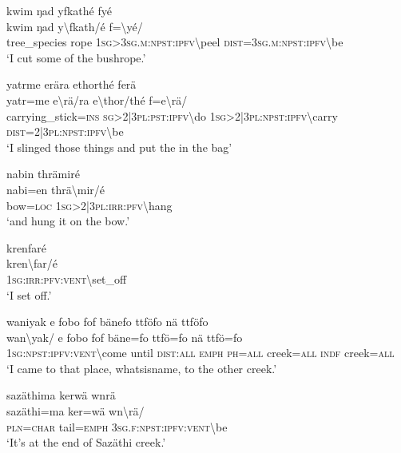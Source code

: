 \ea\label{ex:13:a1361}
kwim ŋad yfkathé fyé\\
\gll kwim	ŋad	y{\textbackslash}fkath/é	f={\textbackslash}yé/\\
     tree\_species	rope	1\textsc{sg}>3\textsc{sg}.\textsc{m}:\textsc{npst}:\textsc{ipfv}{\textbackslash}peel	\textsc{dist}=3\textsc{sg}.\textsc{m}:\textsc{npst}:\textsc{ipfv}{\textbackslash}be\\
\glt `I cut some of the bushrope.'
\z

\ea\label{ex:13:a1362}
yatrme erära ethorthé ferä\\
\gll yatr=me	e{\textbackslash}rä/ra	e{\textbackslash}thor/thé	f=e{\textbackslash}rä/\\
     carrying\_stick=\textsc{ins}	\textsc{sg}>2|3\textsc{pl}:\textsc{pst}:\textsc{ipfv}{\textbackslash}do	1\textsc{sg}>2|3\textsc{pl}:\textsc{npst}:\textsc{ipfv}{\textbackslash}carry	\textsc{dist}=2|3\textsc{pl}:\textsc{npst}:\textsc{ipfv}{\textbackslash}be\\
\glt `I slinged those things and put the in the bag'
\z

\ea\label{ex:13:a1363}
nabin thrämiré\\
\gll nabi=en	thrä{\textbackslash}mir/é\\
     bow=\textsc{loc}	1\textsc{sg}>2|3\textsc{pl}:\textsc{irr}:\textsc{pfv}{\textbackslash}hang\\
\glt `and hung it on the bow.'
\z

\ea\label{ex:13:a1364}
krenfaré\\
\gll kren{\textbackslash}far/é\\
     1\textsc{sg}:\textsc{irr}:\textsc{pfv}:\textsc{vent}{\textbackslash}set\_off\\
\glt `I set off.'
\z

\ea\label{ex:13:a1365}
waniyak e fobo fof bänefo ttföfo nä ttföfo\\
\gll wan{\textbackslash}yak/	e	fobo	fof	bäne=fo	ttfö=fo	nä	ttfö=fo\\
     1\textsc{sg}:\textsc{npst}:\textsc{ipfv}:\textsc{vent}{\textbackslash}come	until	\textsc{dist}:\textsc{all}	\textsc{emph}	\textsc{ph}=\textsc{all}	creek=\textsc{all}	\textsc{indf}	creek=\textsc{all}\\
\glt `I came to that place, whatsisname, to the other creek.'
\z

\ea\label{ex:13:a1368}
sazäthima kerwä wnrä\\
\gll sazäthi=ma	ker=wä	wn{\textbackslash}rä/\\
     \textsc{pln}=\textsc{char}	tail=\textsc{emph}	3\textsc{sg}.\textsc{f}:\textsc{npst}:\textsc{ipfv}:\textsc{vent}{\textbackslash}be\\
\glt `It's at the end of Sazäthi creek.'
\z

